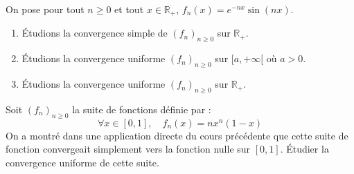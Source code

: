 \documentclass[a4paper,10pt]{report}
\begin{document}
\medskip

\begin{ex} On pose pour tout $n \geq 0$ et tout $x \in \mathbb{R}_+$, $f_n(x)= e^{-nx} \sin(nx)$.

\begin{enumerate}
\item Étudions la convergence simple de $(f_n)_{n \geq 0}$ sur $\mathbb{R}_+$. 
%

\vspace{7cm}
\item Étudions la convergence uniforme $(f_n)_{n \geq 0}$ sur $[a, + \infty[$ où $a>0$. 

\vspace{7cm}
%
\item Étudions la convergence uniforme $(f_n)_{n \geq 0}$ sur $\mathbb{R}_+$. 

\vspace{5cm}
\end{enumerate}
\end{ex}





\begin{exa} Soit $(f_n)_{n \geq 0}$ la suite de fonctions définie par :
$$ \forall x \in [0,1], \quad f_n(x) = n x^n(1-x)$$
On a montré dans une application directe du cours précédente que cette suite de fonction convergeait simplement vers la fonction nulle sur $[0,1]$. Étudier la convergence uniforme de cette suite.
\end{exa} 
\end{document}
